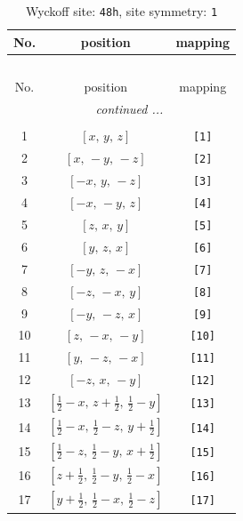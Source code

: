 \documentclass[fleqn,8pt]{jsarticle}
\begin{document}
\begin{longtable}{ccc}
\caption{Wyckoff site: {\tt 48h}, site symmetry: {\tt 1}}
 \\
 \hline \hline
No. & position & mapping \\ \hline \endfirsthead

\multicolumn{2}{l}{\tablename\ \thetable{}} \\
 \hline \hline
No. & position & mapping \\ \hline \endhead

 \hline \hline
\multicolumn{2}{r}{\footnotesize\it continued ...} \\ \endfoot

 \hline \hline
\multicolumn{2}{r}{} \\ \endlastfoot

1 & $\left[ x,\, y,\, z \right]$ & {\tt [1]} \\ \hline
2 & $\left[ x,\, - y,\, - z \right]$ & {\tt [2]} \\ \hline
3 & $\left[ - x,\, y,\, - z \right]$ & {\tt [3]} \\ \hline
4 & $\left[ - x,\, - y,\, z \right]$ & {\tt [4]} \\ \hline
5 & $\left[ z,\, x,\, y \right]$ & {\tt [5]} \\ \hline
6 & $\left[ y,\, z,\, x \right]$ & {\tt [6]} \\ \hline
7 & $\left[ - y,\, z,\, - x \right]$ & {\tt [7]} \\ \hline
8 & $\left[ - z,\, - x,\, y \right]$ & {\tt [8]} \\ \hline
9 & $\left[ - y,\, - z,\, x \right]$ & {\tt [9]} \\ \hline
10 & $\left[ z,\, - x,\, - y \right]$ & {\tt [10]} \\ \hline
11 & $\left[ y,\, - z,\, - x \right]$ & {\tt [11]} \\ \hline
12 & $\left[ - z,\, x,\, - y \right]$ & {\tt [12]} \\ \hline
13 & $\left[ \frac{1}{2} - x,\, z + \frac{1}{2},\, \frac{1}{2} - y \right]$ & {\tt [13]} \\ \hline
14 & $\left[ \frac{1}{2} - x,\, \frac{1}{2} - z,\, y + \frac{1}{2} \right]$ & {\tt [14]} \\ \hline
15 & $\left[ \frac{1}{2} - z,\, \frac{1}{2} - y,\, x + \frac{1}{2} \right]$ & {\tt [15]} \\ \hline
16 & $\left[ z + \frac{1}{2},\, \frac{1}{2} - y,\, \frac{1}{2} - x \right]$ & {\tt [16]} \\ \hline
17 & $\left[ y + \frac{1}{2},\, \frac{1}{2} - x,\, \frac{1}{2} - z \right]$ & {\tt [17]} \\ \hline

\end{longtable}
\end{document}
